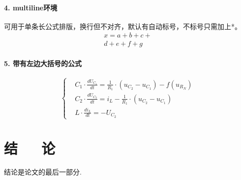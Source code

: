 \documentclass[10pt,a4paper,twocolumn,twoside,UTF8]{ctexart}
\begin{document}
	\paragraph*{4. multiline环境}可用于单条长公式排版，换行但不对齐，默认有自动标号，不标号只需加上*。
		\begin{multline}
		x = a+b+c+{} \\
		d+e+f+g
		\end{multline}

	\paragraph*{5. 带有左边大括号的公式}
	\[\left\{%
		\begin{aligned}
		&C_{1} \cdot \frac{d U_{C_{1}}}{d t}=\frac{1}{R_{1}} \cdot(u_{C_{2}}-u_{C_{1}})-f(u_{R_{N}}) \\
		&C_{2} \cdot \frac{d U_{C_{2}}}{d t}=i_{L}-\frac{1}{R_{1}} \cdot(u_{C_{2}}-u_{C_{1}}) \\
		&L \cdot \frac{d i_{L}}{d t}=-U_{C_{2}}
		\end{aligned}
	   \right.
	\]

\section{结~~~论}
结论是论文的最后一部分.
\printbibliography[title=参考文献]%



\end{document}
